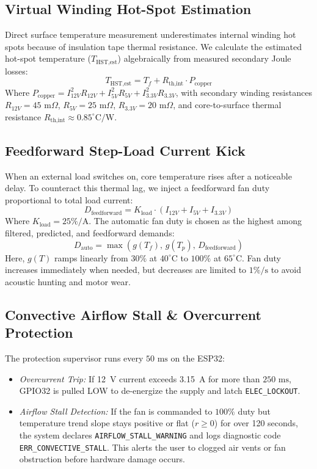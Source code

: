 \documentclass[conference]{IEEEtran}
\begin{document}
\subsection{Virtual Winding Hot-Spot Estimation}
Direct surface temperature measurement underestimates internal winding hot spots because of insulation tape thermal resistance. We calculate the estimated hot-spot temperature ($T_{\text{HST,est}}$) algebraically from measured secondary Joule losses:
\begin{equation}
T_{\text{HST,est}} = T_f + R_{\text{th,int}} \cdot P_{\text{copper}}
\end{equation}
Where $P_{\text{copper}} = I_{12V}^2 R_{12V} + I_{5V}^2 R_{5V} + I_{3.3V}^2 R_{3.3V}$, with secondary winding resistances $R_{12V} = 45\text{ m}\Omega$, $R_{5V} = 25\text{ m}\Omega$, $R_{3.3V} = 20\text{ m}\Omega$, and core-to-surface thermal resistance $R_{\text{th,int}} \approx 0.85^\circ\text{C/W}$.

\subsection{Feedforward Step-Load Current Kick}
When an external load switches on, core temperature rises after a noticeable delay. To counteract this thermal lag, we inject a feedforward fan duty proportional to total load current:
\begin{equation}
D_{\text{feedforward}} = K_{\text{load}} \cdot (I_{12V} + I_{5V} + I_{3.3V})
\end{equation}
Where $K_{\text{load}} = 25\%/\text{A}$. The automatic fan duty is chosen as the highest among filtered, predicted, and feedforward demands:
\begin{equation}
D_{\text{auto}} = \max\left(g(T_f),\, g(T_p),\, D_{\text{feedforward}}\right)
\end{equation}
Here, $g(T)$ ramps linearly from $30\%$ at $40^\circ\text{C}$ to $100\%$ at $65^\circ\text{C}$. Fan duty increases immediately when needed, but decreases are limited to $1\%/\text{s}$ to avoid acoustic hunting and motor wear.

\subsection{Convective Airflow Stall \& Overcurrent Protection}
The protection supervisor runs every $50\text{ ms}$ on the ESP32:
\begin{itemize}
    \item \textit{Overcurrent Trip:} If 12~V current exceeds 3.15~A for more than $250\text{ ms}$, GPIO32 is pulled LOW to de-energize the supply and latch \texttt{ELEC\_LOCKOUT}.
    \item \textit{Airflow Stall Detection:} If the fan is commanded to $100\%$ duty but temperature trend slope stays positive or flat ($r \ge 0$) for over 120 seconds, the system declares \texttt{AIRFLOW\_STALL\_WARNING} and logs diagnostic code \texttt{ERR\_CONVECTIVE\_STALL}. This alerts the user to clogged air vents or fan obstruction before hardware damage occurs.
\end{itemize}
\end{document}
